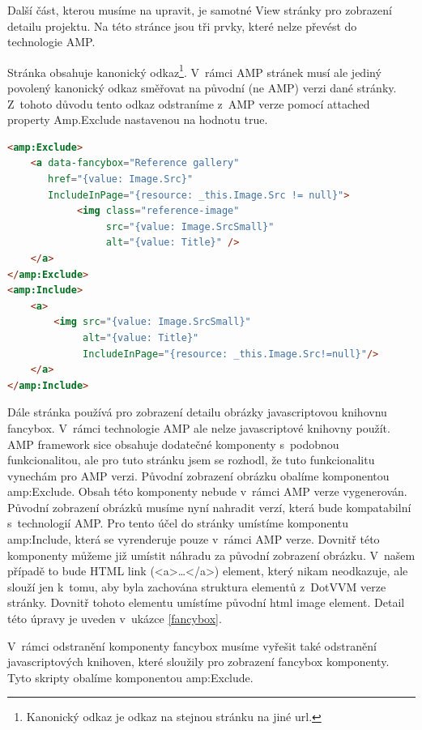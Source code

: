 Další část, kterou musíme na upravit, je samotné View stránky pro zobrazení detailu projektu. Na této stránce jsou tři prvky, které nelze převést do technologie AMP.

Stránka obsahuje kanonický odkaz\footnote{Kanonický odkaz je odkaz na stejnou stránku na jiné url.}. V~rámci AMP stránek musí ale jediný povolený kanonický odkaz směřovat na původní (ne AMP) verzi dané stránky. Z~tohoto důvodu tento odkaz odstraníme z~AMP verze pomocí attached property Amp.Exclude nastavenou na hodnotu true.

\begin{lstlisting}[language=html, caption=Odstranění komponenty fancybox.,label=fancybox,captionpos=t]
<amp:Exclude>
	<a data-fancybox="Reference gallery"
	   href="{value: Image.Src}"
	   IncludeInPage="{resource: _this.Image.Src != null}">
	        <img class="reference-image"
	             src="{value: Image.SrcSmall}"
	             alt="{value: Title}" />
	</a>
</amp:Exclude>
<amp:Include>
	<a>
		<img src="{value: Image.SrcSmall}"
		     alt="{value: Title}"
		     IncludeInPage="{resource: _this.Image.Src!=null}"/>
	</a>
</amp:Include>

\end{lstlisting}

Dále stránka používá pro zobrazení detailu obrázky javascriptovou knihovnu fancybox. V~rámci technologie AMP ale nelze javascriptové knihovny použít. AMP framework sice obsahuje dodatečné komponenty s~podobnou funkcionalitou, ale pro tuto stránku jsem se rozhodl, že tuto funkcionalitu vynechám pro AMP verzi. Původní zobrazení obrázku obalíme komponentou amp:Exclude. Obsah této komponenty nebude v~rámci AMP verze vygenerován. Původní zobrazení obrázků musíme nyní nahradit verzí, která bude kompatabilní s~technologií AMP. Pro tento účel do stránky umístíme komponentu amp:Include, která se vyrenderuje pouze v~rámci AMP verze. Dovnitř této komponenty můžeme již umístit náhradu za původní zobrazení obrázku. V~našem případě to bude HTML link (<a>\ldots</a>) element, který nikam neodkazuje, ale slouží jen k~tomu, aby byla zachována struktura elementů z~DotVVM verze stránky. Dovnitř tohoto elementu umístíme původní html image element. Detail této úpravy je uveden v~ukázce \ref{fancybox}.

V~rámci odstranění komponenty fancybox musíme vyřešit také odstranění javascriptových knihoven, které sloužily pro zobrazení fancybox komponenty. Tyto skripty obalíme komponentou amp:Exclude.




